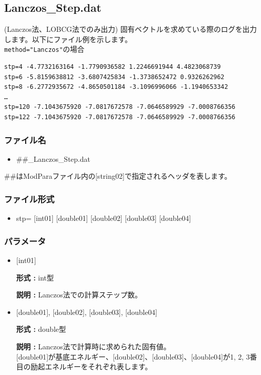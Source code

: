 \newpage
\subsection{Lanczos\_Step.dat}
(Lanczos法、LOBCG法でのみ出力) 固有ベクトルを求めている際のログを出力します。以下にファイル例を示します。\\

\verb|method="Lanczos"|の場合
\begin{minipage}{15cm}
\begin{screen}
\begin{verbatim}
stp=4 -4.7732163164 -1.7790936582 1.2246691944 4.4823068739
stp=6 -5.8159638812 -3.6807425834 -1.3738652472 0.9326262962
stp=8 -6.2772935672 -4.8650501184 -3.1096996066 -1.1940653342
…
stp=120 -7.1043675920 -7.0817672578 -7.0646589929 -7.0008766356
stp=122 -7.1043675920 -7.0817672578 -7.0646589929 -7.0008766356
\end{verbatim}
\end{screen}
\end{minipage}

\subsubsection{ファイル名}
 \begin{itemize}
   \item  \#\#\_Lanczos\_Step.dat
  \end{itemize}
  \#\#はModParaファイル内の[string02]で指定されるヘッダを表します。


\subsubsection{ファイル形式}
 \begin{itemize}
   \item stp= $[$int01$]$ $[$double01$]$ $[$double02$]$ $[$double03$]$ $[$double04$]$
  \end{itemize}
\subsubsection{パラメータ}
 \begin{itemize}

  \item  $[$int01$]$
  
 {\bf 形式 :} int型

{\bf 説明 :} Lanczos法での計算ステップ数。
 
  \item  $[$double01$]$, $[$double02$]$, $[$double03$]$, $[$double04$]$

 {\bf 形式 :} double型 

{\bf 説明 :} Lanczos法で計算時に求められた固有値。\\
$[$double01$]$が基底エネルギー、$[$double02$]$、$[$double03$]$、$[$double04$]$が1, 2, 3番目の励起エネルギーをそれぞれ表します。

 \end{itemize}

